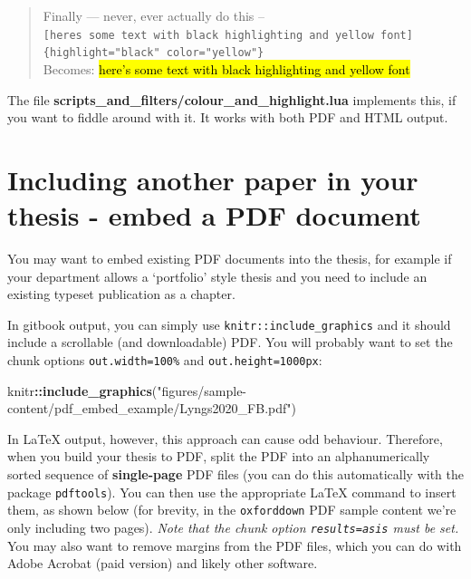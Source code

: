 \documentclass[a4paper, twoside]{templates/ociamthesis}
\newenvironment{Shaded}{\begin{snugshade}}{\end{snugshade}}
\newcommand{\KeywordTok}[1]{\textcolor[rgb]{0.13,0.29,0.53}{\textbf{#1}}}
\newcommand{\NormalTok}[1]{#1}
\newcommand{\OperatorTok}[1]{\textcolor[rgb]{0.81,0.36,0.00}{\textbf{#1}}}
\newcommand{\StringTok}[1]{\textcolor[rgb]{0.31,0.60,0.02}{#1}}
\renewenvironment{Shaded}
{
  \vspace{10pt}%
  \begin{snugshade}%
}{%
  \end{snugshade}%
  \vspace{8pt}%
}
\theoremstyle{definition}
\theoremstyle{definition}
\theoremstyle{definition}
\theoremstyle{definition}
\theoremstyle{remark}
\begin{document}
\begin{quote}
Finally --- never, ever actually do this -- \texttt{{[}here\textquotesingle{}s\ some\ text\ with\ black\ highlighting\ and\ yellow\ font{]}\{highlight="black"\ color="yellow"\}}\\
Becomes: \textcolor{yellow}{\hl{here's some text with black highlighting and yellow font}}
\end{quote}

The file \textbf{scripts\_and\_filters/colour\_and\_highlight.lua} implements this, if you want to fiddle around with it.
It works with both PDF and HTML output.

\hypertarget{embed-pdf}{%
\section{Including another paper in your thesis - embed a PDF document}\label{embed-pdf}}

You may want to embed existing PDF documents into the thesis, for example if your department allows a `portfolio' style thesis and you need to include an existing typeset publication as a chapter.

In gitbook output, you can simply use \texttt{knitr::include\_graphics} and it should include a scrollable (and downloadable) PDF.
You will probably want to set the chunk options \texttt{out.width=\textquotesingle{}100\%\textquotesingle{}} and \texttt{out.height=\textquotesingle{}1000px\textquotesingle{}}:

\begin{Shaded}
\begin{Highlighting}[]
\NormalTok{knitr}\OperatorTok{::}\KeywordTok{include\_graphics}\NormalTok{(}\StringTok{"figures/sample{-}content/pdf\_embed\_example/Lyngs2020\_FB.pdf"}\NormalTok{)}
\end{Highlighting}
\end{Shaded}

In LaTeX output, however, this approach can cause odd behaviour.
Therefore, when you build your thesis to PDF, split the PDF into an alphanumerically sorted sequence of \textbf{single-page} PDF files (you can do this automatically with the package \texttt{pdftools}). You can then use the appropriate LaTeX command to insert them, as shown below (for brevity, in the \texttt{oxforddown} PDF sample content we're only including two pages).
\emph{Note that the chunk option \texttt{results=\textquotesingle{}asis\textquotesingle{}} must be set.}
You may also want to remove margins from the PDF files, which you can do with Adobe Acrobat (paid version) and likely other software.
\end{document}
